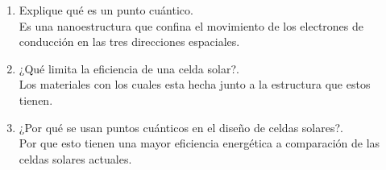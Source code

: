 \documentclass[12pt,letterpaper]{report}
\begin{document}
\begin{enumerate}
    \item Explique qué es un punto cuántico.\\
    Es una nanoestructura que confina el movimiento de los electrones de conducción en las tres direcciones espaciales.
    \item ¿Qué limita la eficiencia de una celda solar?.\\
    Los materiales con los cuales esta hecha junto a la estructura que estos tienen.
    \item ¿Por qué se usan puntos cuánticos en el diseño de celdas solares?.\\
    Por que esto tienen una mayor eficiencia energética a comparación de las celdas solares actuales.
\end{enumerate}
\end{document}
